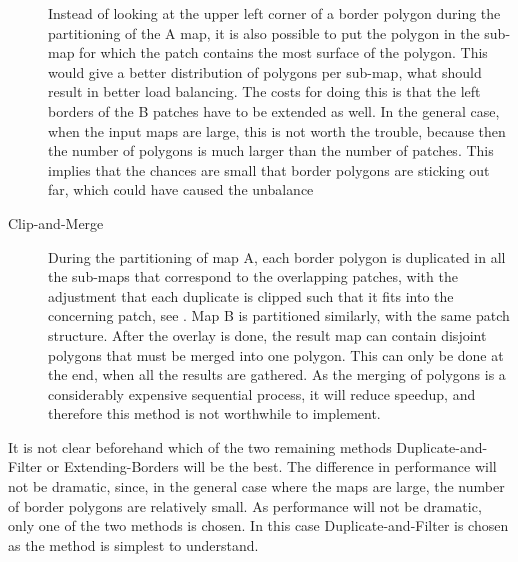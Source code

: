\begin{description}
    Instead of looking at the upper left corner of a border polygon
    during the partitioning of the A map, it is also possible to put
    the polygon in the sub-map for which the patch contains the most
    surface of the polygon.
    This would give a better distribution of polygons per sub-map,
    what should result in better load balancing.
    The costs for doing this is that the left borders of the B patches
    have to be extended as well.
    In the general case, when the input maps are large, this is not
    worth the trouble, because then the number of polygons is much
    larger than the number of patches.
    This implies that the chances are small that border polygons are
    sticking out far, which could have caused the unbalance

  \item[Clip-and-Merge]
    During the partitioning of map A, each border polygon is
    duplicated in all the sub-maps that correspond to the
    overlapping patches, with the adjustment that each duplicate is
    clipped such that it fits into the concerning patch, see
    .
    Map B is partitioned similarly, with the same patch structure.
    After the overlay is done, the result map can contain
    disjoint polygons that must be merged into one polygon.
    This can only be done at the end, when all the results are gathered.
    As the merging of polygons is a considerably expensive sequential
    process, it will reduce speedup, and therefore this method is not
    worthwhile to implement.

    \begin{figure}[hbtp]
      \begin{centering}
        \hspace{0cm}
      \end{centering}
    \end{figure}

\end{description}

It is not clear beforehand which of the two remaining methods
Duplicate-and-Filter or Extending-Borders will be the best.
The difference in performance will not be dramatic, since,
in the general case where the maps are large, the number of border
polygons are relatively small.
As performance will not be dramatic, only one of the two methods is
chosen.
In this case Duplicate-and-Filter is chosen as the method is simplest
to understand.




